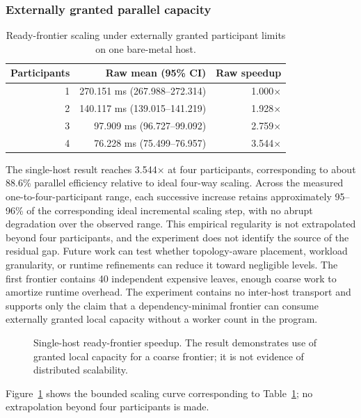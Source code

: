 \subsubsection{Externally granted parallel capacity}
\begin{table}[t]
\centering\footnotesize
\caption{Ready-frontier scaling under externally granted participant limits on one bare-metal host.}\label{tab:parallel}
\begin{tabular}{@{}rrr@{}}\toprule
Participants & Raw mean (95\% CI) & Raw speedup\\ \midrule
1 & 270.151 ms (267.988--272.314) & 1.000$\times$\\
2 & 140.117 ms (139.015--141.219) & 1.928$\times$\\
3 & 97.909 ms (96.727--99.092) & 2.759$\times$\\
4 & 76.228 ms (75.499--76.957) & 3.544$\times$\\ \bottomrule
\end{tabular}
\end{table}
The single-host result reaches 3.544$\times$ at four participants, corresponding to about 88.6\% parallel efficiency relative to ideal four-way scaling. Across the measured one-to-four-participant range, each successive increase retains approximately 95--96\% of the corresponding ideal incremental scaling step, with no abrupt degradation over the observed range. This empirical regularity is not extrapolated beyond four participants, and the experiment does not identify the source of the residual gap. Future work can test whether topology-aware placement, workload granularity, or runtime refinements can reduce it toward negligible levels. The first frontier contains 40 independent expensive leaves, enough coarse work to amortize runtime overhead. The experiment contains no inter-host transport and supports only the claim that a dependency-minimal frontier can consume externally granted local capacity without a worker count in the program.

\iffullvisuals
\begin{figure}[t]
\centering
{}
\caption{Single-host ready-frontier speedup. The result demonstrates use of granted local capacity for a coarse frontier; it is not evidence of distributed scalability.}\label{fig:parallel-speedup}
\end{figure}
Figure~\ref{fig:parallel-speedup} shows the bounded scaling curve corresponding to Table~\ref{tab:parallel}; no extrapolation beyond four participants is made.
\fi

